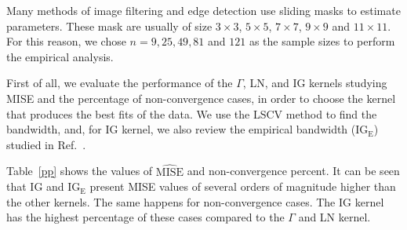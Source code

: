 \documentclass[twocolumn]{svjour3}
\begin{document}
Many methods of image filtering and edge detection use sliding masks to estimate parameters. 
These mask are usually of size $3 \times 3$, $5 \times 5$, $7 \times 7$, $9 \times 9$ and $11 \times 11$. 
For this reason, we chose $n=9,25,49,81$ and $121$ as the sample sizes to perform the empirical analysis.

%    
First of all, we evaluate the performance of the $\Gamma$, LN, and IG kernels studying MISE and the percentage of non-convergence cases, in order to choose the kernel that produces the best fits of the data. 
We use the LSCV method to find the bandwidth, and, for IG kernel, we also review the empirical bandwidth ($\text{IG}_{\text{E}}$) studied in Ref.~\cite{gambini2015}. 

Table~\ref{pp} shows the values of $\widehat{\text{MISE}}$ and non-convergence percent. 
It can be seen that IG and $\text{IG}_{\text{E}}$ present MISE values of several orders of magnitude higher than the other kernels. 
The same happens for non-convergence cases. 
The IG kernel has the highest percentage of these cases compared to the $\Gamma$ and LN kernel.
\end{document}

